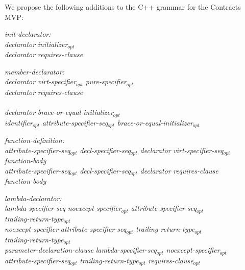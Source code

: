 We propose the following additions to the C++ grammar for the Contracts MVP:

\begin{adjustwidth}{0.5cm}{0.5cm}

\emph{init-declarator:} \\
\phantom{~~~}\emph{declarator} \emph{initializer}$_{opt}$ \\
\phantom{~~~}\emph{declarator} \emph{requires-clause} \\
\phantom{~~~}

\emph{member-declarator:} \\
\phantom{~~~}\emph{declarator} \emph{virt-specifier}$_{opt}$  \emph{pure-specifier}$_{opt}$\\
\phantom{~~~}\emph{declarator} \emph{requires-clause} \\
\phantom{~~~} \\
\phantom{~~~}\emph{declarator} \emph{brace-or-equal-initializer}$_{opt}$ \\
\phantom{~~~}\emph{identifier}$_{opt}$ \emph{attribute-specifier-seq}$_{opt}$ \tcode{:} \emph{brace-or-equal-initializer}$_{opt}$

\emph{function-definition:} \\
\phantom{~~~}\emph{attribute-specifier-seq}$_{opt}$ \emph{decl-specifier-seq}$_{opt}$ \emph{declarator} \emph{virt-specifier-seq}$_{opt}$  \\
\phantom{~~~~~~} \emph{function-body}\\
\phantom{~~~}\emph{attribute-specifier-seq}$_{opt}$ \emph{decl-specifier-seq}$_{opt}$ \emph{declarator} \emph{requires-clause} \\ 
\phantom{~~~~~~} \emph{function-body}

\emph{lambda-declarator:} \\
\phantom{~~~}\emph{lambda-specifier-seq} \emph{noexcept-specifier}$_{opt}$ \emph{attribute-specifier-seq}$_{opt}$ \\
\phantom{~~~~~~}\emph{trailing-return-type}$_{opt}$ \\
\phantom{~~~}\emph{noexcept-specifier} \emph{attribute-specifier-seq}$_{opt}$ \emph{trailing-return-type}$_{opt}$  \\
\phantom{~~~}\emph{trailing-return-type}$_{opt}$ \\
\phantom{~~~}\tcode{(} \emph{parameter-declaration-clause} \tcode{)} \emph{lambda-specifier-seq}$_{opt}$ \emph{noexcept-specifier}$_{opt}$ \\ \phantom{~~~~~~}\emph{attribute-specifier-seq}$_{opt}$ \emph{trailing-return-type}$_{opt}$ \emph{requires-clause}$_{opt}$ 


\end{adjustwidth}
